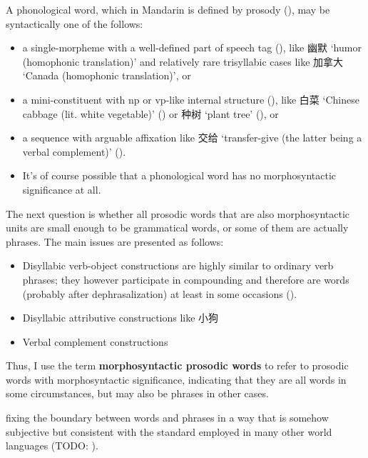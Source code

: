 \documentclass[UTF8, a4paper, oneside, scheme=plain, 12pt]{ctexrep}
\newcommand*{\concept}[1]{\textbf{#1}}
\newcommand{\translate}[1]{`#1'}
\begin{document}
A phonological word,
which in Mandarin is defined by prosody (),
may be syntactically one of the follows: 
\begin{itemize}
    \item a single-morpheme with a well-defined part of speech tag (),
    like 幽默 \translate{humor (homophonic translation)} 
    and relatively rare trisyllabic cases 
    like 加拿大 \translate{Canada (homophonic translation)}, or 
    \item a mini-constituent with \acs{np} or \acs{vp}-like internal structure
    (), 
    like 白菜 \translate{Chinese cabbage (lit. white vegetable)} 
    ()
    or 种树 \translate{plant tree} (), or 
    \item a sequence with arguable affixation 
    like 交给 \translate{transfer-give (the latter being a verbal complement)} 
    ().
    \item It's of course possible that a phonological word 
    has no morphosyntactic significance at all.
\end{itemize}

The next question is 
whether all prosodic words that are also morphosyntactic units 
are small enough to be grammatical words, 
or some of them are actually phrases.
The main issues are presented as follows: 
\begin{itemize}
    \item Disyllabic verb-object constructions
    are highly similar to ordinary verb phrases; 
    they however participate in compounding 
    and therefore are words (probably after dephrasalization) 
    at least in some occasions
    ().

    \item Disyllabic attributive constructions like 小狗 
        
    \item Verbal complement constructions 
\end{itemize}
Thus, I use the term \concept{morphosyntactic prosodic words}
to refer to prosodic words with morphosyntactic significance, 
indicating that they are all words in some circumstances, 
but may also be phrases in other cases.

fixing the boundary between words and phrases in a way 
that is somehow subjective but consistent with 
the standard employed in many other world languages
(TODO: ).
\end{document}
